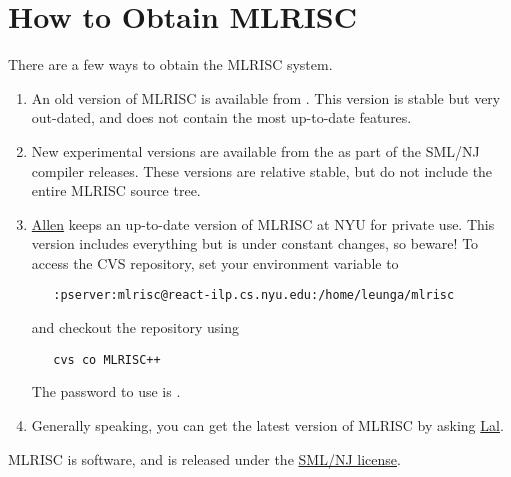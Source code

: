 \section{How to Obtain MLRISC}

There are a few ways to obtain the MLRISC system.
\begin{enumerate}
\item
An old version of MLRISC is available from
.   
This version is stable but very out-dated, and does
not contain the most up-to-date features. 
\item
New experimental versions are available from the 
 as part of the SML/NJ compiler releases.  
These versions are relative stable, but
do not include the entire MLRISC source tree.
\item \href{mailto:leunga@cs.nyu.edu}{Allen} 
keeps an up-to-date version of MLRISC at NYU for private use.
This version includes everything but is under constant changes, so beware!
To access the CVS repository, set your  environment variable 
to
\begin{verbatim}
   :pserver:mlrisc@react-ilp.cs.nyu.edu:/home/leunga/mlrisc
\end{verbatim}
and checkout the repository using
\begin{verbatim}
   cvs co MLRISC++
\end{verbatim}
The password to use is .
\item
Generally speaking, you can get the latest version of MLRISC by asking
\href{mailto:george@research.bell-labs.com}{Lal}.
\end{enumerate}
MLRISC is  software, and is released under the
\href{http://cm.bell-labs.com/cm/cs/what/smlnj/license.html}{SML/NJ license}.
